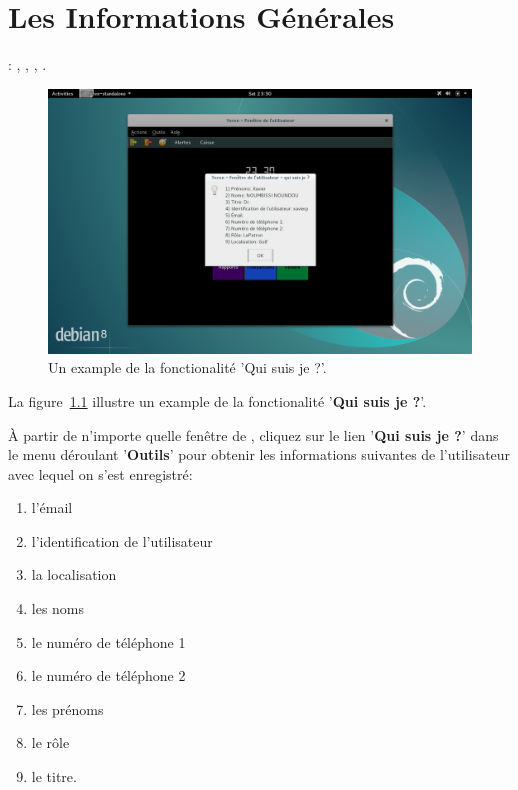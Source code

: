 \chapter{Les Informations G\'en\'erales}\label{chap:informations-generales}

\utilisateurs: \lienadmin, \liencaissier, \lienmagasinier, \lienmanager.\\



\begin{figure}[!htbp]
	\centering
	\includegraphics[scale=0.34]{images/yeren-qui-suis-je.png}
	\caption{Un example de la fonctionalit\'e 'Qui suis je ?'.}
	\label{fig:yeren-qui-suis-je}
\end{figure}

La figure~\ref{fig:yeren-qui-suis-je} illustre un example de
la fonctionalit\'e '\textbf{Qui suis je ?}'.

\`A partir de n'importe quelle fen\^etre de \yeren, cliquez
sur le lien '\textbf{Qui suis je ?}' dans le menu d\'eroulant
'\textbf{Outils}' pour obtenir les informations suivantes
de l'utilisateur avec lequel on s'est enregistr\'e:

\begin{enumerate}[1)]
	\item l'\'email
	\item l'identification de l'utilisateur	
	\item la localisation
	\item les noms	
	\item le num\'ero de t\'el\'ephone 1
	\item le num\'ero de t\'el\'ephone 2	
	\item les pr\'enoms
	\item le r\^ole	
	\item le titre.
\end{enumerate}

